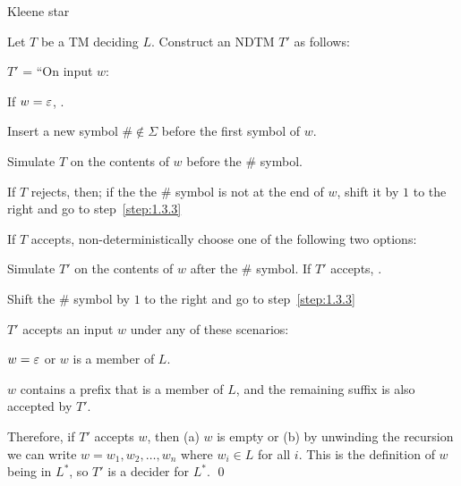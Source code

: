 \begin{problem}
\begin{enumalph}
    \setcounter{enumi}{4}
    \item Kleene star
    \begin{Answer}
      Let $T$ be a TM deciding $L$.  Construct an NDTM $T'$ as follows:

      \step
      $T'$ = ``On input $w$:
        \begin{enumarabic}
          \item If $w = \varepsilon$, \Accept.
          \item Insert a new symbol $\# \notin \Sigma$ before the first
                symbol of $w$.
          \item Simulate $T$ on the contents of $w$ before the $\#$ symbol.~\label{step:1.3.3}
          \item If $T$ rejects, then; if the the $\#$ symbol is not at the end
            of $w$, shift it by $1$ to the right and go to step~\ref{step:1.3.3}
          \item If $T$ accepts, non-deterministically choose one of the following
            two options:
            \begin{enumarabic*}
              \item Simulate $T'$ on the contents of $w$ after the $\#$ symbol.
                If $T'$ accepts, \Accept.
              \item Shift the $\#$ symbol by $1$ to the right and go to step~\ref{step:1.3.3}
            \end{enumarabic*}
        \end{enumarabic}

      \step
      $T'$ accepts an input $w$ under any of these scenarios:
      \begin{enumroman}
        \item $w = \varepsilon$ or $w$ is a member of $L$.
        \item $w$ contains a prefix that is a member of $L$,
          and the remaining suffix is also accepted by $T'$.
      \end{enumroman}

      \step
      Therefore, if $T'$ accepts $w$, then (a) $w$ is empty or
      (b) by unwinding the recursion we can write
      $w = w_1, w_2, \ldots, w_n$ where $w_i \in L$ for all $i$.
      This is the definition of $w$ being in $L^*$, so $T'$ is a decider
      for $L^*$.  \qed
    \end{Answer}
  \end{enumalph}
\end{problem}
